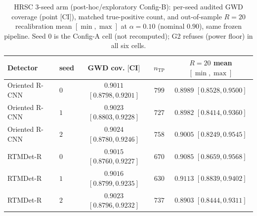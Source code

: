 \documentclass[journal]{IEEEtran}
\begin{document}
\begin{table}[!t]\centering\small
\caption{HRSC 3-seed arm (post-hoc/exploratory Config-B): per-seed audited GWD coverage (point $[$CI$]$),
matched true-positive count, and out-of-sample $R{=}20$ recalibration mean $[\min,\max]$ at $\alpha=0.10$
(nominal $0.90$), same frozen pipeline. Seed $0$ is the Config-A cell (not recomputed); G2 refuses (power floor)
in all six cells.}\label{tab:seedvar}
\begin{tabular}{llccc}
\toprule
Detector & seed & GWD cov. $[$CI$]$ & $n_{\mathrm{TP}}$ & $R{=}20$ mean $[\min,\max]$ \\
\midrule
Oriented R-CNN & $0$ & $0.9011$ $[0.8798,0.9201]$ & $799$ & $0.8989$ $[0.8528,0.9500]$ \\
Oriented R-CNN & $1$ & $0.9023$ $[0.8803,0.9228]$ & $727$ & $0.8982$ $[0.8414,0.9360]$ \\
Oriented R-CNN & $2$ & $0.9024$ $[0.8780,0.9246]$ & $758$ & $0.9005$ $[0.8249,0.9545]$ \\
RTMDet-R       & $0$ & $0.9015$ $[0.8760,0.9227]$ & $670$ & $0.9085$ $[0.8659,0.9568]$ \\
RTMDet-R       & $1$ & $0.9016$ $[0.8799,0.9235]$ & $630$ & $0.9113$ $[0.8839,0.9402]$ \\
RTMDet-R       & $2$ & $0.9023$ $[0.8796,0.9232]$ & $737$ & $0.8903$ $[0.8444,0.9311]$ \\
\bottomrule
\end{tabular}
\end{table}
\end{document}
